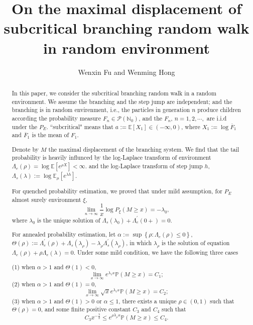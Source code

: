 \documentclass[]{article}
\title{On the maximal displacement of subcritical branching random walk in random environment}
\author{Wenxin Fu and Wenming Hong}
\numberwithin{equation}{section}
\theoremstyle{thmstyleone}%
\theoremstyle{thmstyletwo}%
\theoremstyle{thmstylethree}%
\theoremstyle{thmstylefour}%
\theoremstyle{thmstylefive}%
\theoremstyle{thmstylesix}%
\newcommand{\N}{\mathbb{N}}
\newcommand{\E}{\mathbb{E}}
\renewcommand{\P}{\mathbb{P}}
\begin{document}
	
	
	\maketitle
	
	\begin{abstract}
		In this paper, we consider the subcritical branching random walk in a random environment. We assume the branching and the step jump are independent; and the branching is in random envirenment, i.e., the particles in generation $n$ produce children according the probability measure $F_n\in \mathcal{P}\left(\N_0\right)$, and the $F_n$, $n=1,2,\cdots, $ are i.i.d  under the $P_E$. ``subcritical" means that	$
		a:=\E[X_1]\in (-\infty,0)$, where $X_1:=\log \overline{F}_1$ and $\overline{F}_1$ is the mean of $F_1$.
		
		Denote by $M$ the maximal displacement of the branching system. We find that the tail probability is heavily influnced by the log-Laplace transform of environment $
		\Lambda_e(\rho) = \log \E \left[ e^{\rho X} \right] <\infty.
		$ and the log-Laplace transform of step jump $h$, $\Lambda_s(\lambda):=\log \E_\mu\left[ e^{\lambda h}\right]$.
		
		
		For quenched probability estimation, we proved that under mild assumption, for $P_E$ almost surely environment $\xi$,
		\begin{equation*}
			\lim\limits_{n\rightarrow\infty}
			\frac{1}{x}\log P_\xi\left(M\geqslant x\right) = -\lambda_0,
		\end{equation*}
		where $\lambda_0$ is the unique solution of $\Lambda_s(\lambda_0)+\Lambda_e^\prime(0+)=0$. 
		
		For annealed probability estimation, let $\alpha:=\sup\left\{\rho:\Lambda_e(\rho)\leqslant 0\right\}$, $\varTheta(\rho):=\Lambda_e^\prime(\rho) + \Lambda_s(\lambda_\rho) -\lambda_\rho \Lambda_s^\prime(\lambda_\rho)$, in which $\lambda_\rho$ is the solution of equation $\Lambda_e(\rho)+\rho\Lambda_e(\lambda)=0$.
		Under some mild condition, we have the following three cases 
		
		\noindent (1) when  $\alpha>1$ and $\varTheta(1)<0$,  
		\begin{equation*}
			\lim\limits_{x\rightarrow\infty}e^{\lambda_1 x }\P(M\geqslant x ) = C_1;
		\end{equation*}
	    (2) when $\alpha>1$ and $\varTheta(1)=0$, 
	    \begin{equation*}
	    	\lim\limits_{x\rightarrow\infty}\sqrt{x}e^{\lambda_1 x }\P(M\geqslant x ) = C_2;
	    \end{equation*}
	    (3) when $\alpha>1$ and $\varTheta(1)>0$ or $\alpha\leqslant 1$, there exists a unique $\rho\in (0,1)$ such that $\varTheta(\rho)=0$, and some finite positive constant $C_3$ and $C_4$ such that
	    \begin{equation*}
	    	C_3 x^{-\frac{3}{2}} \leqslant e^{\rho\lambda_\rho x }\P(M\geqslant x ) \leqslant C_4.
	    \end{equation*}
	    

\end{abstract}
\end{document}
